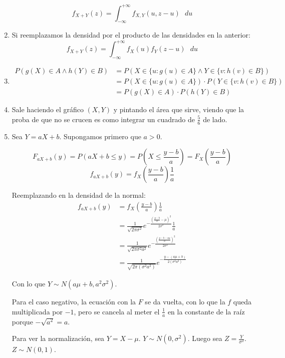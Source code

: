 \begin{enumerate}
		$$f_{X+Y}(z) = \int_{-\infty}^{+\infty} f_{X,Y}(u, z-u)\text{ }du$$
		
	\item
		Si reemplazamos la densidad por el producto de las densidades en la anterior:
		$$f_{X+Y}(z) = \int_{-\infty}^{+\infty} f_{X}(u)f_Y(z-u)\text{ }du$$
		
	\item
		\begin{align*}
			P(g(X) \in A \land h(Y) \in B)	& = P(X\in\{u:g(u) \in A\} \land Y\in\{v:h(v) \in B\})		\\
											& = P(X\in\{u:g(u) \in A\})\cdot P(Y\in\{v:h(v) \in B\})	\\
											& = P(g(X) \in A)\cdot P(h(Y) \in B)
		\end{align*}
		
	\item
		Sale haciendo el gráfico $(X,Y)$ y pintando el área que sirve, viendo que la proba de que no se crucen es como integrar un cuadrado de $\frac{5}{6}$ de lado.
		
	\item
		Sea $Y=aX+b$.
		Supongamos primero que $a>0$.
		
		$$F_{aX+b}(y) = P(aX+b \leq y) = P\left(X \leq \frac{y-b}{a}\right) = F_X\left(\frac{y-b}{a}\right)$$
		$$f_{aX+b}(y) = f_X\left(\frac{y-b}{a}\right)\frac{1}{a}$$
		
		Reemplazando en la densidad de la normal:
		\begin{align*}
			f_{aX+b}(y)	& = f_X\left(\frac{y-b}{a}\right)\frac{1}{a}																\\
						& = \frac{1}{\sqrt{2\pi \sigma^2}} e^{-\frac{\left(\frac{y-b}{a} - \mu\right)^2}{2\sigma^2}} \frac{1}{a}	\\
						& = \frac{1}{\sqrt{2\pi \sigma^2 a^2}} e^{-\frac{\left(\frac{y-b-a\mu}{a}\right)^2}{2\sigma^2}}				\\
						& = \frac{1}{\sqrt{2\pi (\sigma^2 a^2)}} e^{-\frac{y-(a\mu+b)}{2(\sigma^2a^2)}}
		\end{align*}
		
		Con lo que $Y \sim N(a\mu + b, a^2\sigma^2)$.
		
		Para el caso negativo, la ecuación con la $F$ se da vuelta, con lo que la $f$ queda multiplicada por $-1$,
		pero se cancela al meter el $\frac{1}{a}$ en la constante de la raíz porque $-\sqrt{a^2} = a$.
		
		Para ver la normalización, sea $Y = X - \mu$. $Y\sim N(0, \sigma^2)$. Luego sea $Z=\frac{Y}{\sigma^2}$. $Z\sim N(0,1)$.
	

\end{enumerate}
